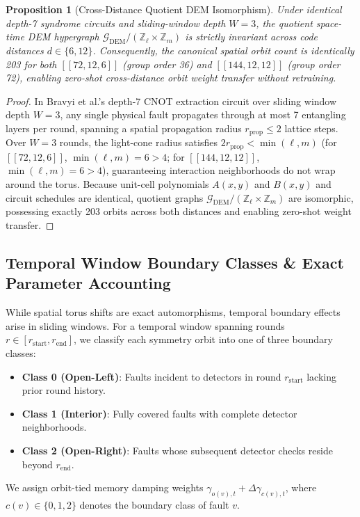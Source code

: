\documentclass[journal]{IEEEtran}
\newtheorem{proposition}{Proposition}
\begin{document}
\begin{proposition}[Cross-Distance Quotient DEM Isomorphism]
\label{prop:cross_distance}
Under identical depth-7 syndrome circuits and sliding-window depth $W=3$, the quotient space-time DEM hypergraph $\mathcal{G}_{\text{DEM}} / (\mathbb{Z}_\ell \times \mathbb{Z}_m)$ is strictly invariant across code distances $d \in \{6, 12\}$. Consequently, the canonical spatial orbit count is identically 203 for both $[[72,12,6]]$ (group order 36) and $[[144,12,12]]$ (group order 72), enabling zero-shot cross-distance orbit weight transfer without retraining.
\end{proposition}

\begin{proof}
In Bravyi et al.'s depth-7 CNOT extraction circuit over sliding window depth $W=3$, any single physical fault propagates through at most 7 entangling layers per round, spanning a spatial propagation radius $r_{\text{prop}} \le 2$ lattice steps. Over $W=3$ rounds, the light-cone radius satisfies $2r_{\text{prop}} < \min(\ell, m)$ (for $[[72,12,6]]$, $\min(\ell, m) = 6 > 4$; for $[[144,12,12]]$, $\min(\ell, m) = 6 > 4$), guaranteeing interaction neighborhoods do not wrap around the torus. Because unit-cell polynomials $A(x,y)$ and $B(x,y)$ and circuit schedules are identical, quotient graphs $\mathcal{G}_{\text{DEM}} / (\mathbb{Z}_\ell \times \mathbb{Z}_m)$ are isomorphic, possessing exactly 203 orbits across both distances and enabling zero-shot weight transfer.
\end{proof}

\subsection{Temporal Window Boundary Classes \& Exact Parameter Accounting}
While spatial torus shifts are exact automorphisms, temporal boundary effects arise in sliding windows. For a temporal window spanning rounds $r \in [r_{\text{start}}, r_{\text{end}}]$, we classify each symmetry orbit into one of three boundary classes:
\begin{itemize}
    \item \textbf{Class 0 (Open-Left)}: Faults incident to detectors in round $r_{\text{start}}$ lacking prior round history.
    \item \textbf{Class 1 (Interior)}: Fully covered faults with complete detector neighborhoods.
    \item \textbf{Class 2 (Open-Right)}: Faults whose subsequent detector checks reside beyond $r_{\text{end}}$.
\end{itemize}
We assign orbit-tied memory damping weights $\gamma_{o(v), t} + \Delta\gamma_{c(v), t}$, where $c(v) \in \{0, 1, 2\}$ denotes the boundary class of fault $v$.
\end{document}
